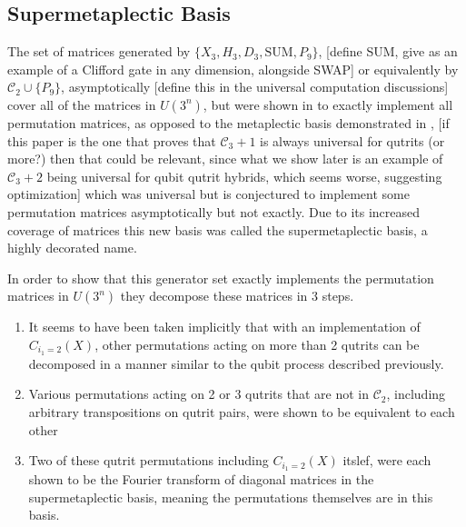 \subsection{Supermetaplectic Basis}
The set of matrices generated by $\{X_3, H_3, D_3, \text{SUM}, P_9\}$, [define SUM, give as an example of a Clifford gate in any dimension, alongside SWAP] or equivalently by $\mathcal{C}_2 \cup \{P_9\}$, asymptotically [define this in the universal computation discussions] cover all of the matrices in $U\left(3^n\right)$, but were shown in \cite{arithmetics} to exactly implement all permutation matrices, as opposed to the metaplectic basis demonstrated in \cite{topological-anyon-thing}, [if this paper is the one that proves that $\mathcal{C}_3 + 1$ is always universal for qutrits (or more?) then that could be relevant, since what we show later is an example of $\mathcal{C}_3 + 2$ being universal for qubit qutrit hybrids, which seems worse, suggesting optimization] which was universal but is conjectured to implement some permutation matrices asymptotically but not exactly. Due to its increased coverage of matrices this new basis was called the supermetaplectic basis, a highly decorated name.

In order to show that this generator set exactly implements the permutation matrices in $U\left(3^n\right)$ they decompose these matrices in 3 steps.
\begin{enumerate}
\item It seems to have been taken implicitly that with an implementation of $C_{i_1 = 2}(X)$, other permutations acting on more than 2 qutrits can be decomposed in a manner similar to the qubit process described previously.
\item Various permutations acting on 2 or 3 qutrits that are not in $\mathcal{C}_2$, including arbitrary transpositions on qutrit pairs, were shown to be equivalent to each other
\item Two of these qutrit permutations including $C_{i_1=2}(X)$ itslef, were each shown to be the Fourier transform of diagonal matrices in the supermetaplectic basis, meaning the permutations themselves are in this basis.
\end{enumerate}

